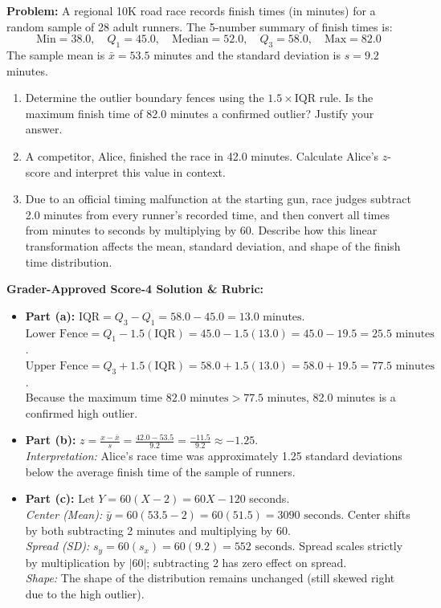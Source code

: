 \begin{frqrubricbox}
\textbf{Problem:} A regional 10K road race records finish times (in minutes) for a random sample of 28 adult runners.
The 5-number summary of finish times is:
\[ \text{Min} = 38.0, \quad Q_1 = 45.0, \quad \text{Median} = 52.0, \quad Q_3 = 58.0, \quad \text{Max} = 82.0 \]
The sample mean is $\bar{x} = 53.5$ minutes and the standard deviation is $s = 9.2$ minutes.
\begin{enumerate}[label=(\alph*)]
  \item Determine the outlier boundary fences using the $1.5 \times \text{IQR}$ rule. Is the maximum finish time of 82.0 minutes a confirmed outlier? Justify your answer.
  \item A competitor, Alice, finished the race in 42.0 minutes. Calculate Alice's $z$-score and interpret this value in context.
  \item Due to an official timing malfunction at the starting gun, race judges subtract 2.0 minutes from every runner's recorded time, and then convert all times from minutes to seconds by multiplying by 60. Describe how this linear transformation affects the mean, standard deviation, and shape of the finish time distribution.
\end{enumerate}

\textbf{Grader-Approved Score-4 Solution \& Rubric:}
\begin{itemize}[leftmargin=1.2em]
  \item \textbf{Part (a):} $\text{IQR} = Q_3 - Q_1 = 58.0 - 45.0 = 13.0\text{ minutes}$.\\
  $\text{Lower Fence} = Q_1 - 1.5(\text{IQR}) = 45.0 - 1.5(13.0) = 45.0 - 19.5 = 25.5\text{ minutes}$.\\
  $\text{Upper Fence} = Q_3 + 1.5(\text{IQR}) = 58.0 + 1.5(13.0) = 58.0 + 19.5 = 77.5\text{ minutes}$.\\
  Because the maximum time $82.0\text{ minutes} > 77.5\text{ minutes}$, 82.0 minutes is a confirmed high outlier.
  \item \textbf{Part (b):} $z = \frac{x - \bar{x}}{s} = \frac{42.0 - 53.5}{9.2} = \frac{-11.5}{9.2} \approx -1.25$.\\
  \textit{Interpretation:} Alice's race time was approximately 1.25 standard deviations below the average finish time of the sample of runners.
  \item \textbf{Part (c):} Let $Y = 60(X - 2) = 60X - 120$ seconds.\\
  \textit{Center (Mean):} $\bar{y} = 60(53.5 - 2) = 60(51.5) = 3090\text{ seconds}$. Center shifts by both subtracting 2 minutes and multiplying by 60.\\
  \textit{Spread (SD):} $s_y = 60(s_x) = 60(9.2) = 552\text{ seconds}$. Spread scales strictly by multiplication by $|60|$; subtracting 2 has zero effect on spread.\\
  \textit{Shape:} The shape of the distribution remains unchanged (still skewed right due to the high outlier).
\end{itemize}
\end{frqrubricbox}

